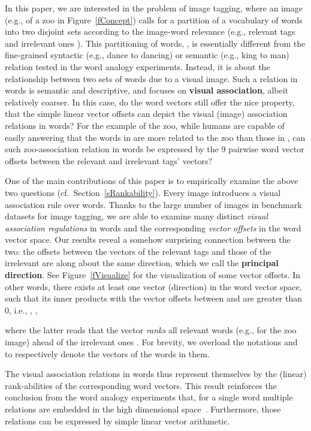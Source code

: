 \documentclass[10pt,twocolumn,letterpaper]{article}
\begin{document}
In this paper, we are interested in the problem of image tagging, where an image (e.g., of a zoo in Figure~\ref{fConcept}) calls for a partition of a vocabulary of words into two disjoint sets according to the image-word relevance (e.g., relevant tags  and irrelevant ones ). This partitioning of words, , is essentially different from the {fine-grained} syntactic (e.g., {dance} to {dancing}) or semantic (e.g., {king} to {man}) relation tested in the word analogy experiments. Instead, it is about the relationship between two {sets} of words due to a visual image. Such a relation in words is semantic and descriptive, and  focuses on \textbf{visual association}, albeit relatively {coarser}.  In this case, do the  word vectors still offer the nice property, that {the simple linear vector offsets can depict the visual (image) association relations in words?} For the example of the zoo, while humans are capable of easily answering that the words in  are more related to the zoo than those in , can such zoo-association relation in words be expressed by the 9 pairwise word vector offsets  between the relevant  and irrelevant  tags' vectors? 


One of the main contributions of this paper is to empirically examine the above two questions (cf.\ Section~\ref{sRankability}). Every image introduces a visual association rule   over  words. Thanks to the large number of images in  benchmark datasets for image tagging, we are able to examine many distinct \emph{visual association regulations} in words and the corresponding \emph{vector offsets} in the word vector space. Our results reveal a somehow surprising connection between the two:  the offsets between the vectors of the relevant tags  and those of the irrelevant  are along about the same direction, which we call the \textbf{principal direction}. See Figure~\ref{fVisualize} for the visualization of some vector offsets. In other words, there exists at least one vector (direction)  in the word vector space, such that its inner products with  the vector offsets between  and  are greater than 0, i.e., , , 

where the latter reads that the vector  \emph{ranks} all relevant words   (e.g., for the zoo image) ahead of the irrelevant ones  . For brevity, we overload the notations  and  to respectively denote the vectors of the words in them. 

The visual association relations in words thus represent themselves by the {(linear)} rank-abilities of the corresponding word vectors.  This result reinforces the conclusion from the word analogy experiments that, for a
single word multiple relations are embedded  in the high dimensional
space~\cite{mikolov_linguistic_2013,pennington_glove:_2014}. Furthermore, those relations can be expressed by simple linear vector arithmetic. 
\end{document}
